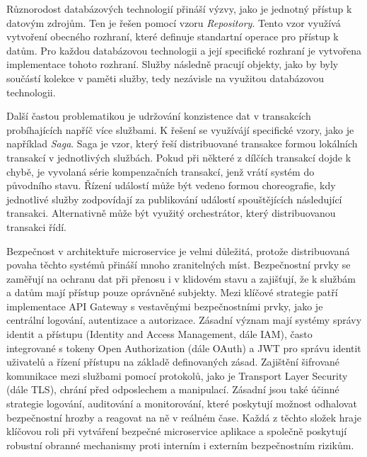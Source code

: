 Různorodost databázových technologií přináší výzvy, jako je jednotný přístup k datovým zdrojům. Ten je řešen pomocí vzoru \emph{Repository}. Tento vzor využívá vytvoření obecného rozhraní, které definuje standartní operace pro přístup k datům. Pro každou databázovou technologii a její specifické rozhraní je vytvořena implementace tohoto rozhraní. \cite{Newman2015} Služby následně pracují objekty, jako by byly součástí kolekce v paměti služby, tedy nezávisle na využitou databázovou technologii.


Další častou problematikou je udržování konzistence dat v transakcích probíhajících napříč více službami. K řešení se využívájí specifické vzory, jako je například \emph{Saga}. Saga je vzor, který řeší distribuované transakce formou lokálních transakcí v jednotlivých službách. Pokud při některé z dílčích transakcí dojde k chybě, je vyvolaná série kompenzačních transakcí, jenž vrátí systém do původního stavu. Řízení událostí může být vedeno formou choreografie, kdy jednotlivé služby zodpovídají za publikování událostí spouštějících následující transakci. Alternativně může být využitý orchestrátor, který distribuovanou transakci řídí. \cite{richardsonsaga}


Bezpečnost v architektuře microservice je velmi důležitá, protože distribuovaná povaha těchto systémů přináší mnoho zranitelných míst. Bezpečnostní prvky se zaměřují na ochranu dat při přenosu i v klidovém stavu a zajišťují, že k službám a datům mají přístup pouze oprávněné subjekty. Mezi klíčové strategie patří implementace API Gateway s vestavěnými bezpečnostními prvky, jako je centrální logování, autentizace a autorizace. \cite{Williams2023} Zásadní význam mají systémy správy identit a přístupu (Identity and Access Management, dále IAM), často integrované s tokeny Open Authorization (dále OAuth) a JWT pro správu identit uživatelů a řízení přístupu na základě definovaných zásad. Zajištění šifrované komunikace mezi službami pomocí protokolů, jako je Transport Layer Security (dále TLS), chrání před odposlechem a manipulací. \cite{Richardson2018} Zásadní jsou také účinné strategie logování, auditování a monitorování, které poskytují možnost odhalovat bezpečnostní hrozby a reagovat na ně v reálném čase. Každá z těchto složek hraje klíčovou roli při vytváření bezpečné microservice aplikace a společně poskytují robustní obranné mechanismy proti interním i externím bezpečnostním rizikům.

